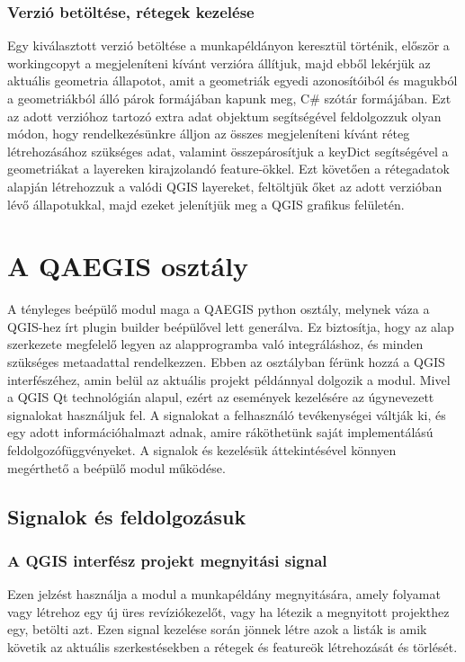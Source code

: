 \subsubsection{Verzió betöltése, rétegek kezelése}
Egy kiválasztott verzió betöltése a munkapéldányon keresztül történik, először a workingcopyt a megjeleníteni kívánt verzióra állítjuk, majd ebből lekérjük az aktuális geometria állapotot, amit a geometriák egyedi azonosítóiból és magukból a geometriákból álló párok formájában kapunk meg, C\# szótár formájában. Ezt az adott verzióhoz tartozó extra adat objektum segítségével feldolgozzuk olyan módon, hogy rendelkezésünkre álljon az összes megjeleníteni kívánt réteg létrehozásához szükséges adat, valamint összepárosítjuk a keyDict segítségével a geometriákat a layereken kirajzolandó feature-ökkel. Ezt követően a rétegadatok alapján létrehozzuk a valódi QGIS layereket, feltöltjük őket az adott verzióban lévő állapotukkal, majd ezeket jelenítjük meg a QGIS grafikus felületén.

\section{A QAEGIS osztály}
A tényleges beépülő modul maga a QAEGIS python osztály, melynek váza a QGIS-hez írt plugin builder beépülővel lett generálva. Ez biztosítja, hogy az alap szerkezete megfelelő legyen az alapprogramba való integráláshoz, és minden szükséges metaadattal rendelkezzen. Ebben az osztályban férünk hozzá a QGIS interfészéhez, amin belül az aktuális projekt példánnyal dolgozik a modul. Mivel a QGIS Qt technológián alapul, ezért az események kezelésére az úgynevezett signalokat használjuk fel. A signalokat a felhasználó tevékenységei váltják ki, és egy adott információhalmazt adnak, amire ráköthetünk saját implementálású feldolgozófüggvényeket. A signalok és kezelésük áttekintésével könnyen megérthető a beépülő modul működése.
\subsection{Signalok és feldolgozásuk}
\subsubsection{A QGIS interfész projekt megnyitási signal}
Ezen jelzést használja a modul a munkapéldány megnyitására, amely folyamat vagy létrehoz egy új üres revíziókezelőt, vagy ha létezik a megnyitott projekthez egy, betölti azt. Ezen signal kezelése során jönnek létre azok a listák is amik követik az aktuális szerkestésekben a rétegek és featureök létrehozását és törlését.

